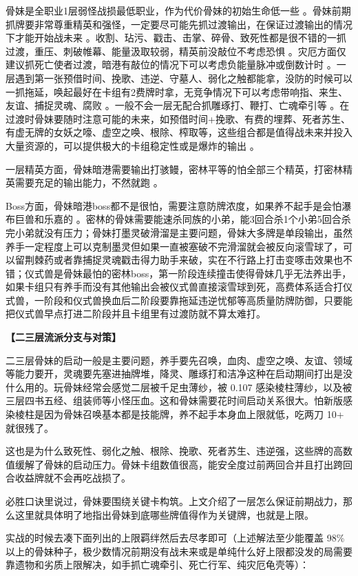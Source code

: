 ﻿\documentclass[12pt, a4paper]{article}
\begin{document}
骨妹是全职业1层弱怪战损最低职业，作为代价骨妹的初始生命低一些 。骨妹前期抓牌要非常尊重精英和强怪，一定要尽可能先抓过渡输出，在保证过渡输出的情况下才能开始战未来 。收割、玷污、戳击、击掌、碎骨、致死性都是很不错的一抓过渡，重压、刺破帷幕、能量汲取较弱，精英前没敲位不考虑恐惧 。灾厄方面仅建议抓死亡使者过渡，暗港有敲位的情况下可以考虑负能量脉冲或倒数计时 。一层遇到第一张预借时间、挽歌、违逆、守墓人、弱化之触都能拿，没防的时候可以一抓拖延，唤起最好在卡组有2费牌时拿，无竞争情况下可以考虑带响指、来生、友谊、捕捉灵魂、腐败 。一般不会一层无配合抓雕琢打、鞭打、亡魂牵引等 。在过渡时骨妹要随时注意可能的未来，如预借时间+挽歌、有费的埋葬、死者苏生、有虚无牌的女妖之嚎、虚空之唤、根除、榨取等，这些组合都是值得战未来并投入大量资源的，可以提供极大的卡组稳定性或是爆炸的输出 。

一层精英方面，骨妹暗港需要输出打骇鳗，密林平等的怕全部三个精英，打密林精英需要充足的输出能力，不然就跑 。

Boss方面，骨妹暗港boss都不是很怕，需要注意防牌浓度，如果养不起手是会怕瀑布巨兽和乐嘉的 。密林的骨妹需要能速杀同族的小弟，能3回合杀1个小弟5回合杀完小弟就没有压力；骨妹打墨灵破滑溜是主要问题，骨妹大多牌是单段输出，虽然养手一定程度上可以克制墨灵但如果一直被塞破不完滑溜就会被反向滚雪球了，可以留荆棘药或者靠捕捉灵魂戳击得力助手来破，实在不行路上打击变啄击效果也不错；仪式兽是骨妹最怕的密林boss，第一阶段连续撞击使得骨妹几乎无法养出手，如果卡组只有养手而没有其他输出会被仪式兽直接滚雪球到死，高费体系适合打仪式兽，一阶段和仪式兽换血后二阶段要靠拖延违逆忧郁等高质量防牌防御，只要能把仪式兽早点打进二阶段并且卡组里有过渡防就不算太难打。

\textbf{【二三层流派分支与对策】}

二三层骨妹的启动一般是主要问题，养手要先召唤，血肉、虚空之唤、友谊、领域等能力要开，灵魂要先塞进抽牌堆，降灵、雕琢打和洁净这种在启动期间打出是没什么用的。玩骨妹经常会感觉二层被千足虫薄纱，被 0.107 感染棱柱薄纱，以及被三层四书五经、组装师等小怪压血。这和骨妹需要花时间启动关系很大。怕新版感染棱柱是因为骨妹召唤基本都是技能牌，养不起手本身血上限就低，吃两刀 10+ 就很残了。

这也是为什么致死性、弱化之触、根除、挽歌、死者苏生、违逆强，这些牌的高数值缓解了骨妹的启动压力。骨妹卡组数值很高，能安全度过前两回合并且打出跨回合收益牌就不会再吃战损了。

必胜口诀里说过，骨妹要围绕关键卡构筑。上文介绍了一层怎么保证前期战力，那么这里就具体明了地指出骨妹到底哪些牌值得作为关键牌，也就是上限。

实战的时候去凑下面列出的上限羁绊然后去尽孝即可（上述解法至少能覆盖 98\% 以上的骨妹种子，极少数情况前期没有战未来或是单纯什么好上限都没发的局需要靠遗物和劣质上限解决，如手抓亡魂牵引、死亡行军、纯灾厄龟壳等）：
\end{document}
